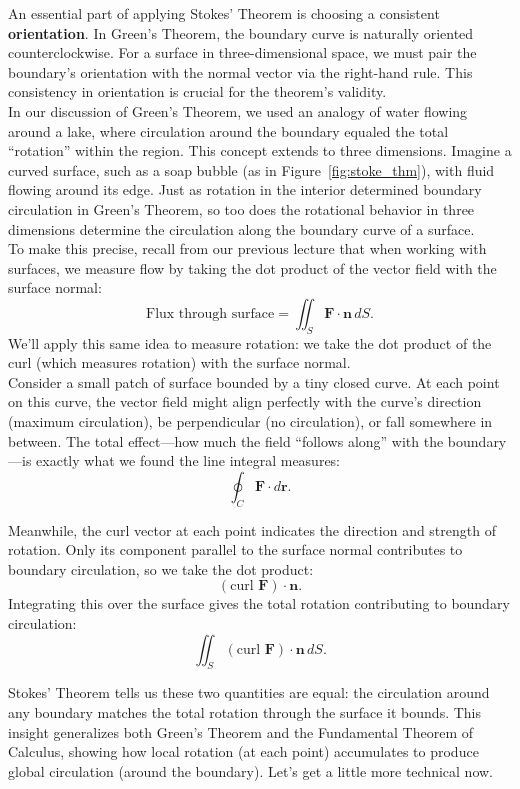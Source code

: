 \noindent
An essential part of applying Stokes' Theorem is choosing a consistent \textbf{orientation}. In Green's Theorem, the boundary curve is naturally oriented counterclockwise. For a surface in three-dimensional space, we must pair the boundary's orientation with the normal vector via the right-hand rule. This consistency in orientation is crucial for the theorem's validity. \\

\noindent
In our discussion of Green's Theorem, we used an analogy of water flowing around a lake, where circulation around the boundary equaled the total ``rotation” within the region. This concept extends to three dimensions. Imagine a curved surface, such as a soap bubble (as in Figure~\ref{fig:stoke_thm}), with fluid flowing around its edge. Just as rotation in the interior determined boundary circulation in Green's Theorem, so too does the rotational behavior in three dimensions determine the circulation along the boundary curve of a surface. \\

\noindent To make this precise, recall from our previous lecture that when working with surfaces, we measure flow by taking the dot product of the vector field with the surface normal:
\[
\text{Flux through surface} = \iint_S \mathbf{F} \cdot \mathbf{n}\,dS.
\]
We'll apply this same idea to measure rotation: we take the dot product of the curl (which measures rotation) with the surface normal. \\

\noindent Consider a small patch of surface bounded by a tiny closed curve. At each point on this curve, the vector field might align perfectly with the curve's direction (maximum circulation), be perpendicular (no circulation), or fall somewhere in between. The total effect—how much the field ``follows along” with the boundary—is exactly what we found the line integral measures:
\[
\oint_C \mathbf{F} \cdot d\mathbf{r}.
\]

\noindent Meanwhile, the curl vector at each point indicates the direction and strength of rotation. Only its component parallel to the surface normal contributes to boundary circulation, so we take the dot product:
\[
(\text{curl }\mathbf{F}) \cdot \mathbf{n}.
\]
\noindent Integrating this over the surface gives the total rotation contributing to boundary circulation:
\[
\iint_S (\text{curl }\mathbf{F}) \cdot \mathbf{n}\,dS.
\]

\noindent Stokes' Theorem tells us these two quantities are equal: the circulation around any boundary matches the total rotation through the surface it bounds. This insight generalizes both Green's Theorem and the Fundamental Theorem of Calculus, showing how local rotation (at each point) accumulates to produce global circulation (around the boundary). Let's get a little more technical now.

